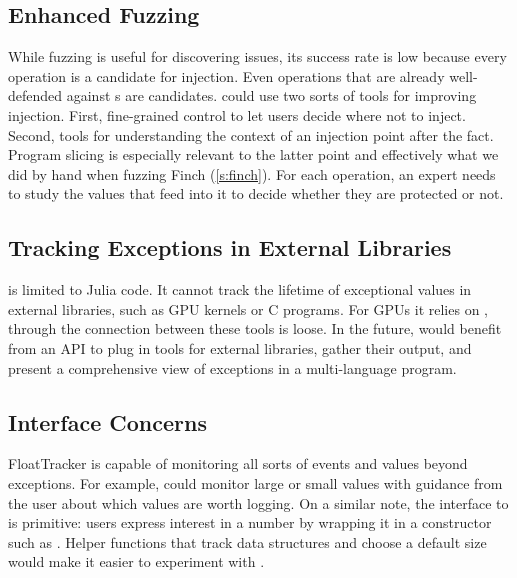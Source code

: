 \documentclass{juliacon}
\begin{document}
\subsection{Enhanced Fuzzing}

While fuzzing is useful for discovering issues, its success rate
is low because {every} \fp{} operation is a candidate
for injection.
Even operations that are already well-defended against \NaN{}s are candidates.
\FT{} could use two sorts of tools for improving injection.
First, fine-grained control to let users decide where not to inject.
Second, tools for understanding the context of an injection point
after the fact.
Program slicing is especially relevant to the latter point and effectively
what we did by hand when fuzzing Finch (\cref{s:finch}).
For each operation, an expert needs to study the values that feed into it to
decide whether they are protected or not.


\subsection{Tracking Exceptions in External Libraries}

\FT{} is limited to Julia code.
It cannot track the lifetime of exceptional values in external libraries, such as GPU kernels or C programs.
For GPUs it relies on \GPUFPX{}, through the connection between these tools is loose.
In the future, \FT{} would benefit from an API to plug in tools for external libraries, gather their output,
and present a comprehensive view of exceptions in a multi-language program.


\subsection{Interface Concerns}

FloatTracker is capable of monitoring all sorts of events and \fp{} values beyond exceptions.
For example, \FT{} could monitor large or small values with guidance from the user about which values are worth logging.
On a similar note, the interface to \FT{} is primitive: users express interest in a number by wrapping it
in a constructor such as .
Helper functions that track data structures and choose a default size would
make it easier to experiment with \FT{}.
\end{document}
